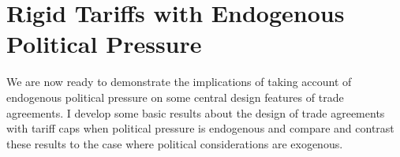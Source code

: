 \documentclass[12pt]{article}
\newcommand{\ga}{\gamma}
\begin{document}

\section{Rigid Tariffs with Endogenous Political Pressure}
\label{sec:rigid}
We are now ready to demonstrate the implications of taking account of endogenous political pressure on some central design features of trade agreements. I develop some basic results about the design of trade agreements with tariff caps when political pressure is endogenous and compare and contrast these results to the case where political considerations are exogenous.
\end{document}
